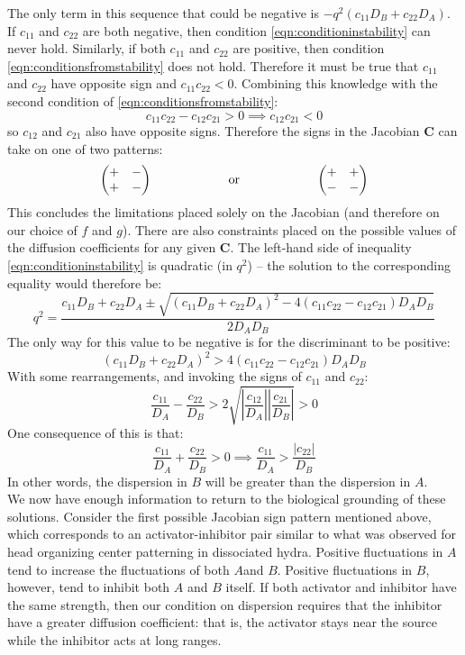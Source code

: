 \documentclass{article}
\begin{document}
The only term in this sequence that could be negative is $-q^2(c_{11} D_B + c_{22} D_A)$. If $c_{11}$ and $c_{22}$ are both negative, then condition \ref{eqn:conditioninstability} can never hold. Similarly, if both $c_{11}$ and $c_{22}$ are positive, then condition \ref{eqn:conditionsfromstability} does not hold. Therefore it must be true that $c_{11}$ and $c_{22}$ have opposite sign and $c_{11}c_{22} < 0$. Combining this knowledge with the second condition of \ref{eqn:conditionsfromstability}:
\[ c_{11}c_{22} - c_{12} c_{21} > 0 \implies c_{12} c_{21}  < 0 \]
so $c_{12}$ and $c_{21}$ also have opposite signs. Therefore the signs in the Jacobian $\mathbf{C}$ can take on one of two patterns:
\[ \begin{pmatrix} + & - \\ + & - \end{pmatrix} \hspace{2 cm} \textrm{ or } \hspace{2 cm}  \begin{pmatrix} + & + \\ - & - \end{pmatrix} \]
This concludes the limitations placed solely on the Jacobian (and therefore on our choice of $f$ and $g$). There are also constraints placed on the possible values of the diffusion coefficients for any given $\mathbf{C}$. The left-hand side of inequality \ref{eqn:conditioninstability} is quadratic (in $q^2$) -- the solution to the corresponding equality would therefore  be:
\[ q^2 = \frac{c_{11} D_B + c_{22} D_A \pm \sqrt{\left( c_{11} D_B + c_{22} D_A \right)^2 - 4 \left( c_{11} c_{22} - c_{12} c_{21} \right)D_A D_B }}{2 D_A D_B} \]
The only way for this value to be negative is for the discriminant to be positive:
\[ \left( c_{11} D_B + c_{22} D_A \right)^2 > 4 \left( c_{11} c_{22} - c_{12} c_{21} \right)D_A D_B \]
With some rearrangements, and invoking the signs of $c_{11}$ and $c_{22}$:
\[ \frac{c_{11}}{D_A} - \frac{c_{22}}{D_B} > 2 \sqrt{\left| \frac{c_{12}}{D_A} \right| \left| \frac{c_{21}}{D_B} \right|} > 0 \]
One consequence of this is that:
\[ \frac{c_{11}}{D_A} + \frac{c_{22}}{D_B} > 0 \implies  \frac{c_{11}}{D_A} > \frac{|c_{22}|}{D_B} \]
In other words, the dispersion in $B$ will be greater than the dispersion in $A$.\\

We now have enough information to return to the biological grounding of these solutions. Consider the first possible Jacobian sign pattern mentioned above, which corresponds to an activator-inhibitor pair similar to what was observed for head organizing center patterning in dissociated hydra. Positive fluctuations in $A$ tend to increase the fluctuations of both $A$and $B$. Positive fluctuations in $B$, however, tend to inhibit both $A$ and $B$ itself. If both activator and inhibitor have the same strength, then our condition on dispersion requires that the inhibitor have a greater diffusion coefficient: that is, the activator stays near the source while the inhibitor acts at long ranges.\\
\end{document}
